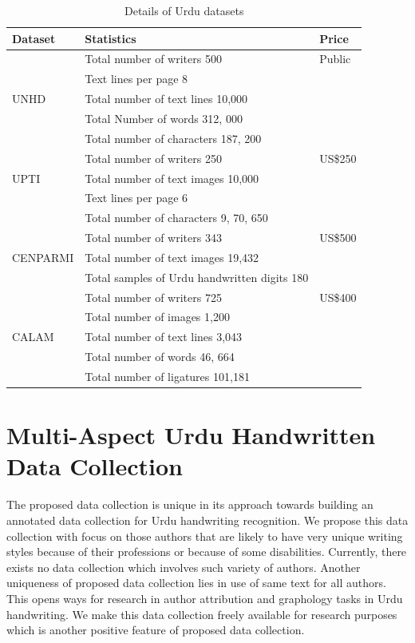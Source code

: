 \documentclass[a4paper,conference]{IEEEtran}
\begin{document}
\begin{table}[t]
\centering
\caption{Details of Urdu datasets}\label{tab6}
\begin{tabular}{@{}lll@{}}
\hline
Dataset	& Statistics & Price \\ \hline
& Total number of writers 500 & Public\\
& Text lines per page 8 & \\
UNHD \cite{15} & Total number of text lines 10,000 &\\
& Total Number of words 312, 000 &\\
& Total number of characters 187, 200 &\\ 
 \hline
& Total number of writers 250 & US\$250\\
UPTI\cite{21} & Total number of text images 10,000 \\
& Text lines per page 6 \\
& Total number of characters 9, 70, 650 &\\
\hline
& Total number of writers 343 & US\$500 \\
CENPARMI \cite{32} & Total number of text images 19,432 &  \\
& Total samples of Urdu handwritten digits 180 &\\
\hline
& Total number of writers 725 & US\$400\\
& Total number of images 1,200 &\\
CALAM \cite{58} & Total number of text lines 3,043  &\\
& Total number of words 46, 664 &\\
& Total number of ligatures 101,181 &\\
\hline
 \end{tabular}
\end{table}


\section{Multi-Aspect Urdu Handwritten Data Collection}
The proposed data collection is unique in its approach towards building an annotated data collection for Urdu handwriting recognition. We propose this data collection with focus on those authors that are likely to have very unique writing styles because of their professions or because of some disabilities. Currently, there exists no data collection which involves such variety of authors. Another uniqueness of proposed data collection lies in use of same text for all authors. This opens ways for research in author attribution and graphology tasks in Urdu handwriting. We make this data collection freely available for research purposes which is another positive feature of proposed data collection. 
\end{document}
